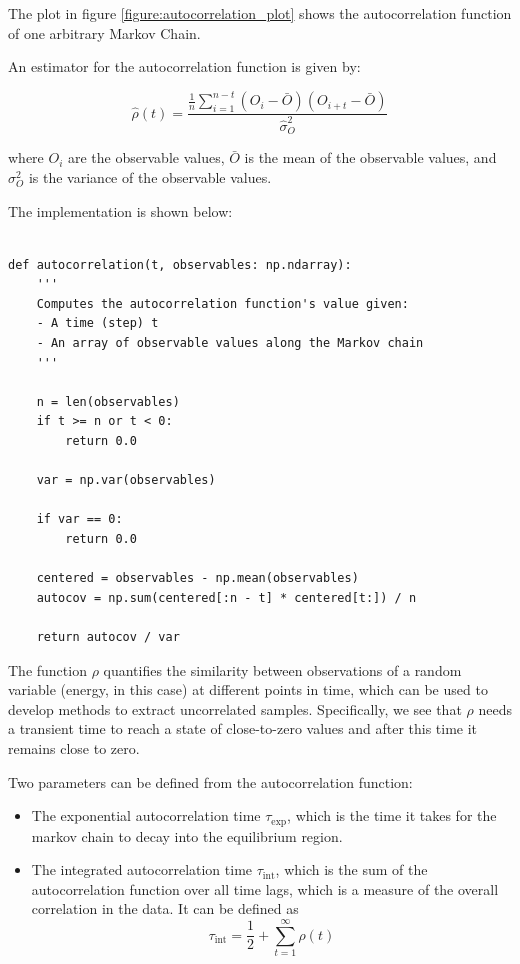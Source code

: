 The plot in figure \ref{figure:autocorrelation_plot} shows the autocorrelation function of one arbitrary Markov Chain.

An estimator for the autocorrelation function is given by:

\begin{equation}
    \hat{\rho}(t) = \frac{\frac{1}{n} \sum_{i=1}^{n-t} (O_i - \bar{O})(O_{i+t} - \bar{O})}{\hat{\sigma}^2_O}
\end{equation}

where $O_i$ are the observable values, $\bar{O}$ is the mean of the observable values, and $\sigma^2_O$ is the variance of the observable values.

The implementation is shown below:

\begin{verbatim}

def autocorrelation(t, observables: np.ndarray):
	'''
	Computes the autocorrelation function's value given:
	- A time (step) t
	- An array of observable values along the Markov chain
	'''

	n = len(observables)
	if t >= n or t < 0:
		return 0.0

	var = np.var(observables)

	if var == 0:
		return 0.0

	centered = observables - np.mean(observables)
	autocov = np.sum(centered[:n - t] * centered[t:]) / n

	return autocov / var

\end{verbatim}

The function $\rho$ quantifies the similarity between observations of a random variable (energy, in this case) at different points in time, which can be used to develop methods to extract uncorrelated samples. Specifically, we see that $\rho$ needs a transient time to reach a state of close-to-zero values and after this time it remains close to zero.

Two parameters can be defined from the autocorrelation function:

\begin{itemize}
	\item The exponential autocorrelation time $\tau_{\text{exp}}$, which is the time it takes for the markov chain to decay into the equilibrium region.
	\item The integrated autocorrelation time $\tau_{\text{int}}$, which is the sum of the autocorrelation function over all time lags, which is a measure of the overall correlation in the data. It can be defined as 
    \begin{equation}
        \label{def:tau_int}
        \tau_{\text{int}} = \frac{1}{2} + \sum_{t=1}^{\infty} \rho(t)
    \end{equation}
\end{itemize}

